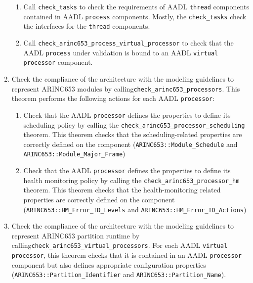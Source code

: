 \documentclass[times, 10pt]{article}
\begin{document}
\begin{enumerate}
\begin{enumerate}
            \item
                Call \texttt{check\_tasks} to check the requirements of AADL
                \texttt{thread} components contained in AADL \texttt{process}
                components. Mostly, the \texttt{check\_tasks} check the
                interfaces for the \texttt{thread} components.
            \item
                Call \texttt{check\_arinc653\_process\_virtual\_processor} to check
                that the AADL \texttt{process} under validation is bound
                to an AADL \texttt{virtual processor} component.
        \end{enumerate}
    \item
        Check the compliance of the architecture with
        the modeling guidelines to represent ARINC653 modules
        by calling\texttt{check\_arinc653\_processors}. This theorem
        performs the following actions for each AADL \texttt{processor}:
        \begin{enumerate}
            \item
                Check that the AADL \texttt{processor} defines
                the properties to define its scheduling policy
                by calling the \texttt{check\_arinc653\_processor\_scheduling}
                theorem. This theorem checks that the scheduling-related
                properties are correctly defined on the component
                (\texttt{ARINC653::Module\_Schedule} and 
                \texttt{ARINC653::Module\_Major\_Frame})
            \item
                Check that the AADL \texttt{processor} defines
                the properties to define its health monitoring policy
                by calling the \texttt{check\_arinc653\_processor\_hm}
                theorem. This theorem checks that the health-monitoring related
                properties are correctly defined on the component
                (\texttt{ARINC653::HM\_Error\_ID\_Levels} and 
                \texttt{ARINC653::HM\_Error\_ID\_Actions})
        \end{enumerate}
    \item
        Check the compliance of the architecture with
        the modeling guidelines to represent ARINC653 partition runtime
        by calling\texttt{check\_arinc653\_virtual\_processors}.
        For each AADL \texttt{virtual processor}, this theorem checks
        that it is contained in an AADL \texttt{processor} component but also
        defines appropriate configuration properties
        (\texttt{ARINC653::Partition\_Identifier} and
        \texttt{ARINC653::Partition\_Name}).
\end{enumerate}
\end{document}
